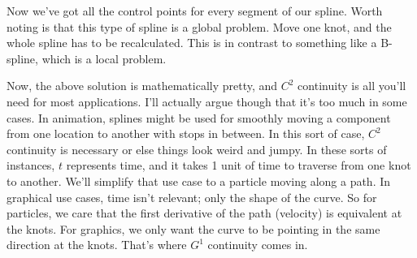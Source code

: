 \documentclass[10pt]{article}
\begin{document}
	Now we've got all the control points for every segment of our spline. Worth
	noting is that this type of spline is a global problem. Move one knot, and
	the whole spline has to be recalculated. This is in contrast to something
	like a B-spline, which is a local problem.

	\clearpage

	Now, the above solution is mathematically pretty, and $C^{2}$ continuity
	is all you'll need for most applications. I'll actually argue though that
	it's too much in some cases. In animation, splines might be used for
	smoothly moving a component from one location to another with stops in
	between. In this sort of case, $C^{2}$ continuity is necessary or else
	things look weird and jumpy. In these sorts of instances, $t$ represents
	time, and it takes 1 unit of time to traverse from one knot to another.
	We'll simplify that use case to a particle moving along a path. In graphical
	use cases, time isn't relevant; only the shape of the curve. So for
	particles, we care that the first derivative of the path (velocity) is
	equivalent at the knots. For graphics, we only want the curve to be pointing
	in the same direction at the knots. That's where $G^{1}$ continuity comes
	in.
\end{document}
